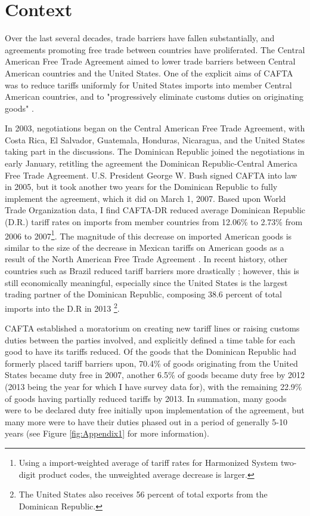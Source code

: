 \documentclass[12pt]{article}
\begin{document}
\vspace{-10pt}
\section{Context}
\label{sec:Context}
Over the last several decades, trade barriers have fallen substantially, and agreements promoting
free trade between countries have proliferated. The Central American Free Trade 
Agreement aimed to lower trade barriers between Central American countries and 
the United States. One of the explicit aims of CAFTA was to reduce tariffs uniformly 
for United States imports into member Central American countries, and to "progressively eliminate customs duties on 
originating goods" \citep{ustraderep}.

In 2003, negotiations began on the Central American Free Trade Agreement, with Costa Rica, El 
Salvador, Guatemala, Honduras, Nicaragua, and the United States taking part in the discussions. The 
Dominican Republic joined the negotiations in early January, retitling the agreement the Dominican 
Republic-Central America Free Trade Agreement. U.S. President George W. 
Bush signed CAFTA into law in 2005, but it took another two years for the 
Dominican Republic to fully implement the agreement, which it did on March 1, 2007.
Based upon World Trade Organization data,
I find CAFTA-DR reduced average Dominican 
Republic (D.R.) tariff rates on imports from member countries from 12.06\% to 2.73\% from 2006 to 
2007\footnote{Using a import-weighted average
of tariff rates for Harmonized System two-digit product codes, 
the unweighted average decrease is larger.}. The magnitude of this decrease on imported American
goods is similar to the size of the decrease in Mexican tariffs on American goods as a result of the
North American Free Trade Agreement \citep{goldberg}. 
In recent history, other countries such as Brazil reduced tariff barriers more drastically
\citep{kovak}; however, this is still economically meaningful, especially since the United States 
is the largest trading partner of the Dominican Republic, composing 
38.6 percent of  total imports into the D.R in 2013 \citep{wtocountry}\footnote{The 
United States also receives 56 percent of total exports from the Dominican Republic.}.

CAFTA established a moratorium on creating new tariff lines or raising customs 
duties between the parties involved, and explicitly defined a time table for each good to have its 
tariffs reduced. Of the goods that the Dominican Republic had formerly placed tariff barriers upon,
70.4\% of goods originating from the United States became duty free in 2007, another 6.5\%
of goods became duty free by 2012 (2013 being the year for which I have survey data for), with
the remaining 22.9\% of goods having partially reduced tariffs by 2013.
In summation, many goods were to be declared duty free initially upon implementation of the agreement, 
but many more were to have their duties phased out in a period of generally 5-10 years 
(see Figure \ref{fig:Appendix1} for more information). 
\end{document}
